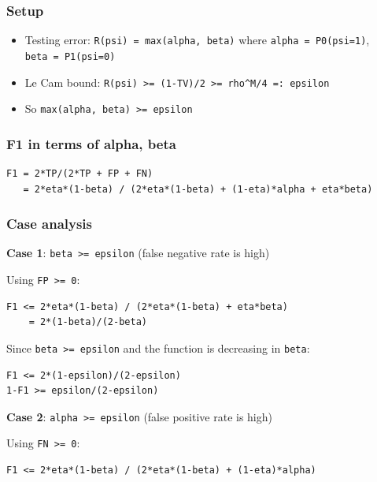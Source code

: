 \documentclass[
  12pt,
]{article}
\providecommand{\tightlist}{%
  \setlength{\itemsep}{0pt}\setlength{\parskip}{0pt}}
\begin{document}
\subsubsection{Setup}\label{setup}

\begin{itemize}
\tightlist
\item
  Testing error: \texttt{R(psi)\ =\ max(alpha,\ beta)} where
  \texttt{alpha\ =\ P0(psi=1)}, \texttt{beta\ =\ P1(psi=0)}
\item
  Le Cam bound:
  \texttt{R(psi)\ \textgreater{}=\ (1-TV)/2\ \textgreater{}=\ rho\^{}M/4\ =:\ epsilon}
\item
  So \texttt{max(alpha,\ beta)\ \textgreater{}=\ epsilon}
\end{itemize}

\subsubsection{F1 in terms of alpha,
beta}\label{f1-in-terms-of-alpha-beta}

\begin{verbatim}
F1 = 2*TP/(2*TP + FP + FN)
   = 2*eta*(1-beta) / (2*eta*(1-beta) + (1-eta)*alpha + eta*beta)
\end{verbatim}

\subsubsection{Case analysis}\label{case-analysis}

\textbf{Case 1}: \texttt{beta\ \textgreater{}=\ epsilon} (false negative
rate is high)

Using \texttt{FP\ \textgreater{}=\ 0}:

\begin{verbatim}
F1 <= 2*eta*(1-beta) / (2*eta*(1-beta) + eta*beta)
    = 2*(1-beta)/(2-beta)
\end{verbatim}

Since \texttt{beta\ \textgreater{}=\ epsilon} and the function is
decreasing in \texttt{beta}:

\begin{verbatim}
F1 <= 2*(1-epsilon)/(2-epsilon)
1-F1 >= epsilon/(2-epsilon)
\end{verbatim}

\textbf{Case 2}: \texttt{alpha\ \textgreater{}=\ epsilon} (false
positive rate is high)

Using \texttt{FN\ \textgreater{}=\ 0}:

\begin{verbatim}
F1 <= 2*eta*(1-beta) / (2*eta*(1-beta) + (1-eta)*alpha)
\end{verbatim}
\end{document}
